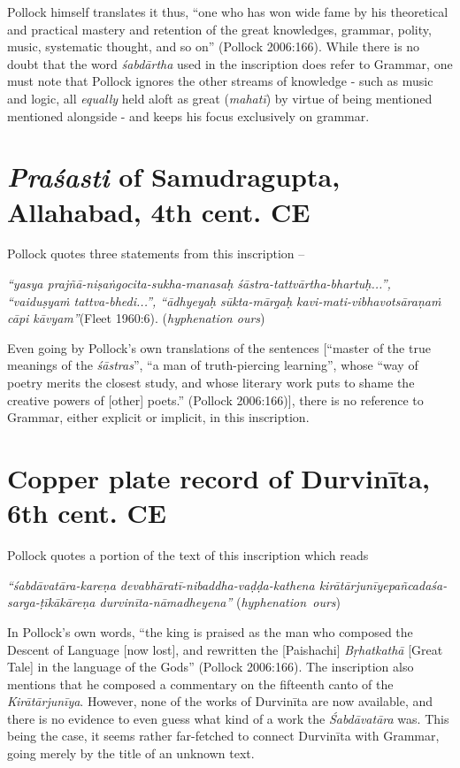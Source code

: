 Pollock himself translates it thus, ``one who has won wide fame by his theoretical and practical mastery and retention of the great knowledges, grammar, polity, music, systematic thought, and so on'' (Pollock 2006:166). While there is no doubt that the word {\sl śabdārtha} used in the inscription does refer to Grammar, one must note that Pollock ignores the other streams of knowledge - such as music and logic, all {\sl equally} held aloft as great ({\sl mahatī}) by virtue of being mentioned mentioned alongside - and keeps his focus exclusively on grammar. 

\section{{\sl\bfseries Praśasti} of Samudragupta, Allahabad, 4th cent. CE}\label{chap3-sec2}

Pollock quotes three statements from this inscription -- 
\begin{myquote}
{{\sl ``yasya prajñā-niṣaṅgocita-sukha-manasaḥ śāstra-tattvārtha-bhartuḥ...'', ``vai\-duṣyaṁ tattva-bhedi...'', ``ādhyeyaḥ sūkta-mārgaḥ kavi-mati-vibhavotsāraṇaṁ cāpi kāvyam''}}\hfill (Fleet 1960:6). ({\sl hyphenation ours}) 
\end{myquote}

Even going by Pollock's own translations of the sentences [``master of the true meanings of the {\sl śāstras}'', ``a man of truth-piercing learning'', whose ``way of poetry merits the closest study, and whose literary work puts to shame the creative powers of [other] poets.'' (Pollock 2006:166)], there is no reference to Grammar, either explicit or implicit, in this inscription.

\section{Copper plate record of Durvinīta, 6th cent. CE}\label{chap3-sec3}

Pollock quotes a portion of the text of this inscription which reads 
\begin{myquote}
{{\sl ``śabdāvatāra-kareṇa devabhāratī-nibaddha-vaḍḍa-kathena kirātārjunīye\break pañ\-ca\-daśa-sarga-ṭīkākāreṇa durvinīta-nāmadheyena''}} 
\hfill \hbox{({\sl hyphenation ours})}
\end{myquote}

In Pollock's own words, ``the king is praised as the man who composed the Descent of Language [now lost], and rewritten the [Paishachi] {\sl Bṛhatkathā} [Great Tale] in the language of the Gods'' (Pollock 2006:166). The inscription also mentions that he composed a commentary on the fifteenth canto of the {\sl Kirātārjunīya}. However, none of the works of Durvinīta are now available, and there is no evidence to even guess what kind of a work the {\sl Śabdāvatāra} was. This being the case, it seems rather far-fetched to connect Durvinīta with Grammar, going merely by the title of an unknown text. 

